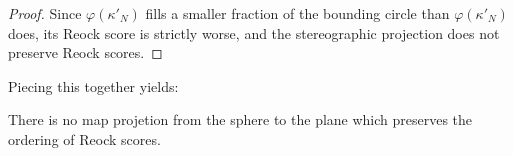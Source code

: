 \begin{proof}
  Since $\varphi(\kappa'_N)$ fills a smaller fraction of the bounding
  circle than $\varphi(\kappa'_N)$ does, its Reock score is strictly
  worse, and the stereographic projection does not preserve Reock
  scores.
\end{proof}
Piecing this together yields:
\begin{theorem}
  There is no map projetion from the sphere to the plane which preserves the ordering of Reock scores.
\end{theorem}
